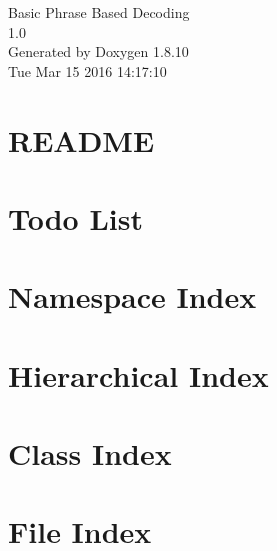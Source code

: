 \documentclass[twoside]{book}
\newcommand{\+}{\discretionary{\mbox{\scriptsize$\hookleftarrow$}}{}{}}
\newcommand{\clearemptydoublepage}{%
  \newpage{\pagestyle{empty}\cleardoublepage}%
}
\begin{document}
\hypersetup{pageanchor=false,
             bookmarks=true,
             bookmarksnumbered=true,
             pdfencoding=unicode
            }
\begin{titlepage}
\vspace*{7cm}
\begin{center}%
{\Large Basic Phrase Based Decoding \\[1ex]\large 1.\+0 }\\
\vspace*{1cm}
{\large Generated by Doxygen 1.8.10}\\
\vspace*{0.5cm}
{\small Tue Mar 15 2016 14:17:10}\\
\end{center}
\end{titlepage}
\clearemptydoublepage
\tableofcontents
\clearemptydoublepage
{}
\hypersetup{pageanchor=true}

\chapter{R\+E\+A\+D\+M\+E}
\label{md__r_e_a_d_m_e}
\hypertarget{md__r_e_a_d_m_e}{}

\chapter{Todo List}
\label{todo}
\hypertarget{todo}{}

\chapter{Namespace Index}

\chapter{Hierarchical Index}

\chapter{Class Index}

\chapter{File Index}

\end{document}
